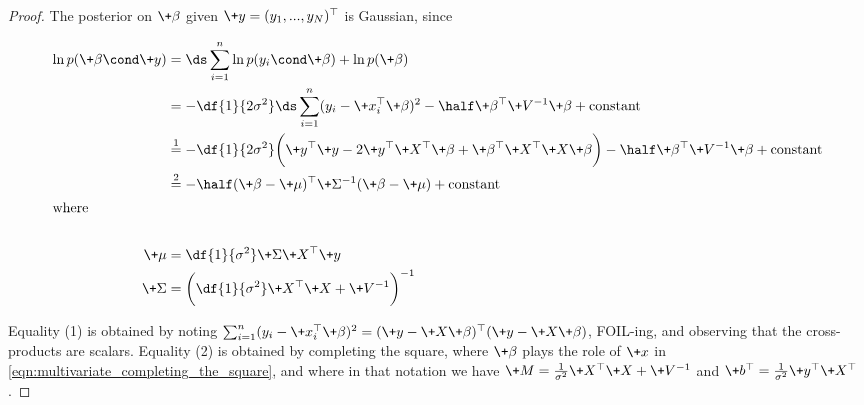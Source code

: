\documentclass{article} %
\begin{document}
\begin{proof}
The posterior on $\+\beta$ given $\+y = (y_1,...,y_N)^\top$ is Gaussian,  since

\begin{align*}
\ln p(\+\beta \cond \+y) &= \ds\sum_{i=1}^n \ln p(y_i \cond \+\beta)  + \ln p(\+\beta) \\
&= -\df{1}{2 \sigma^2} \ds\sum_{i=1}^n (y_i - \+x_i^\top \+\beta)^2  - \half \+\beta^\top \+V^{-1} \+\beta + \text{constant} \\
&\stackrel{1}{=} -\df{1}{2 \sigma^2} \bigg(  \+y^\top \+y - 2 \+y^\top \+X^\top \+\beta + \+\beta^\top \+X^\top \+X \+\beta \bigg)  - \half \+\beta^\top \+V^{-1} \+\beta + \text{constant} \\
&\stackrel{2}{=} -\half (\+\beta - \+\mu)^\top \+\Sigma^{-1} (\+\beta - \+\mu) +  \text{constant} \\
\intertext{where}  \\
\+\mu &= \df{1}{\sigma^2} \+\Sigma \+X^\top \+y \\
\+\Sigma &= \bigg( \df{1}{\sigma^2}  \+X^\top \+X + \+V^{-1}  \bigg)^{-1} \\
\end{align*}

Equality (1) is obtained by noting $ \sum_{i=1}^n (y_i - \+x_i^\top \+\beta)^2  = (\+y - \+X \+\beta)^\top (\+y - \+X \+\beta)$, FOIL-ing, and observing that the cross-products are scalars.   Equality (2) is obtained by completing the square,  where $\+\beta$ plays the role of $\+x$  in \eqref{eqn:multivariate_completing_the_square},  and where in that notation we have $\+M = \frac{1}{\sigma^2} \+X^\top \+X + \+V^{-1}$ and $\+b^\top = \frac{1}{\sigma^2} \+y^\top \+X^\top$.
\end{proof}
\end{document}
